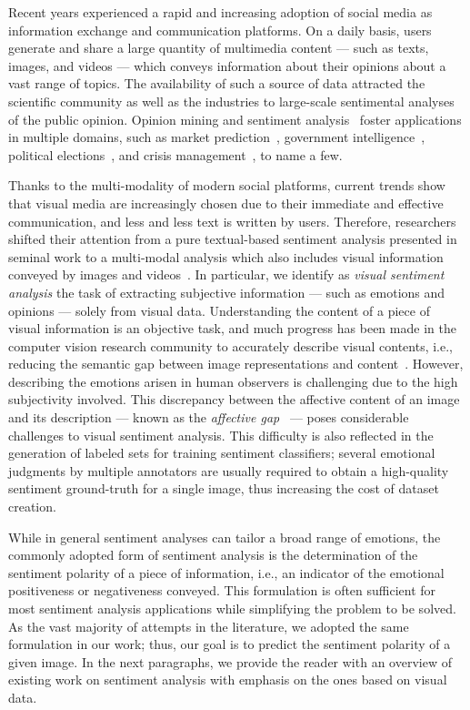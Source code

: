 Recent years experienced a rapid and increasing adoption of social media as information exchange and communication platforms.
On a daily basis, users generate and share a large quantity of multimedia content --- such as texts, images, and videos --- which conveys information about their opinions about a vast range of topics.
The availability of such a source of data attracted the scientific community as well as the industries to large-scale sentimental analyses of the public opinion.
Opinion mining and sentiment analysis~\cite{pang2008opinion} foster applications in multiple domains, such as market prediction~\cite{mishne2006predicting,asur2010predicting}, government intelligence~\cite{abbasi2007affect}, political elections~\cite{laver2003extracting,o2010tweets}, and crisis management~\cite{avvenuti2016impromptu,cresci2015linguistically}, to name a few.

Thanks to the multi-modality of modern social platforms, current trends show that visual media are increasingly chosen due to their immediate and effective communication, and less and less text is written by users.
Therefore, researchers shifted their attention from a pure textual-based sentiment analysis presented in seminal work to a multi-modal analysis which also includes visual information conveyed by images and videos~\cite{borth2013large,cao2016cross,jou2015visual,siersdorfer2010analyzing,you2015robust,you2016cross}.
In particular, we identify as \emph{visual sentiment analysis} the task of extracting subjective information --- such as emotions and opinions --- solely from visual data.
Understanding the content of a piece of visual information is an objective task, and much progress has been made in the computer vision research community to accurately describe visual contents, i.e., reducing the semantic gap between image representations and content~\cite{li2016socializing}.
However, describing the emotions arisen in human observers is challenging due to the high subjectivity involved.
This discrepancy between the affective content of an image and its description --- known as the \emph{affective gap}~\cite{siersdorfer2010analyzing} --- poses considerable challenges to visual sentiment analysis.
This difficulty is also reflected in the generation of labeled sets for training sentiment classifiers;
several emotional judgments by multiple annotators are usually required to obtain a high-quality sentiment ground-truth for a single image, thus increasing the cost of dataset creation.

While in general sentiment analyses can tailor a broad range of emotions, the commonly adopted form of sentiment analysis is the determination of the sentiment polarity of a piece of information, i.e., an indicator of the emotional positiveness or negativeness conveyed.
This formulation is often sufficient for most sentiment analysis applications while simplifying the problem to be solved.
As the vast majority of attempts in the literature, we adopted the same formulation in our work;
thus, our goal is to predict the sentiment polarity of a given image.
In the next paragraphs, we provide the reader with an overview of existing work on sentiment analysis with emphasis on the ones based on visual data.

